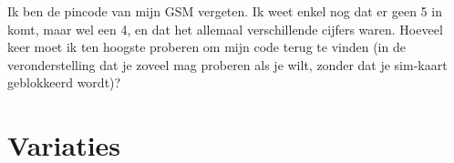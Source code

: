 \documentclass[12pt,twoside]{article}
\begin{document}
\begin{oefening}
Ik ben de pincode van mijn GSM vergeten. Ik weet enkel nog dat er geen 5 in komt, maar wel een 4, en dat het allemaal verschillende cijfers waren. Hoeveel keer moet ik ten hoogste proberen om mijn code terug te vinden (in de veronderstelling dat je zoveel mag proberen als je wilt, zonder dat je sim-kaart geblokkeerd wordt)?
\end{oefening}

% 
% 


\pagebreak
\section{Variaties}
\end{document}
